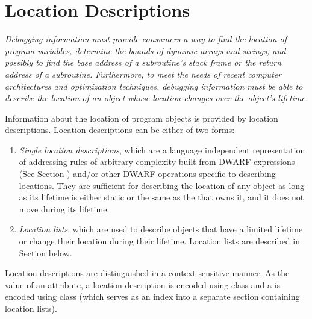 \section{Location Descriptions}
\label{chap:locationdescriptions}
\textit{Debugging information 
must 
provide consumers a way to find
the location of program variables, determine the bounds
of dynamic arrays and strings, and possibly to find the
base address of a subroutine\textquoteright s stack frame or the return
address of a subroutine. Furthermore, to meet the needs of
recent computer architectures and optimization techniques,
debugging information must be able to describe the location of
an object whose location changes over the object\textquoteright s lifetime.}

Information about the location of program objects is provided
by location descriptions. Location descriptions can be either
of two forms:
\begin{enumerate}[1. ]
\item \textit{Single location descriptions}, 
which 
are 
a language independent representation of
addressing rules of arbitrary complexity built from 
DWARF expressions (See Section ) 
and/or other
DWARF operations specific to describing locations. They are
sufficient for describing the location of any object as long
as its lifetime is either static or the same as the 
 that owns it, 
and it does not move during its lifetime.


\item \textit{Location lists}, which are used to 
describe
objects that have a limited lifetime or change their location
during their lifetime. Location lists are described in
Section  below.

\end{enumerate}

Location descriptions are distinguished in a context sensitive
manner. As the value of an attribute, a location description
is encoded using class \CLASSexprloc{}
and a  is encoded
using class \CLASSloclist{} (which serves as an 
index into a separate section containing location lists).

